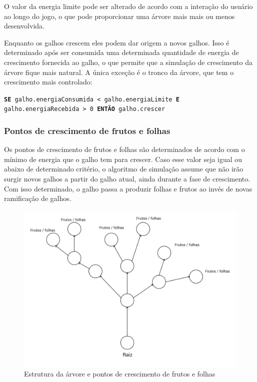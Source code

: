 \documentclass[12pt]{article}
\begin{document}
O valor da energia limite pode
ser alterado de acordo com a intera\c c\~ao do usu\'ario ao longo do jogo, o que pode proporcionar uma \'arvore mais
mais ou menos desenvolvida.

Enquanto os galhos crescem eles podem dar origem a novos galhos. Isso \'e determinado ap\'os ser consumida uma determinada
quantidade de energia de crescimento fornecida ao galho, o que permite que a simula\c c\~ao de crescimento da \'arvore
fique mais natural. A \'unica exce\c c\~ao \'e o tronco da \'arvore, que tem o crescimento
mais controlado:

\texttt{\footnotesize{\textbf{SE} galho.energiaConsumida < galho.energiaLimite \textbf{E} galho.energiaRecebida > 0
\textbf{ENT\~AO} galho.crescer}}

\subsubsection{Pontos de crescimento de frutos e folhas}
Os pontos de crescimento de frutos e folhas s\~ao determinados de acordo com o m\'inimo de energia que o galho
tem para crescer. Caso esse valor seja igual ou abaixo de determinado crit\'erio, o algoritmo de simula\c c\~ao assume
que n\~ao ir\~ao surgir novos galhos a partir do galho atual, ainda durante a fase de crescimento. Com isso determinado,
o galho passa a produzir folhas e frutos ao inv\'es de novas ramifica\c c\~ao de galhos.

	\begin{figure}[ht!]
	\begin{center}
		\includegraphics[scale=0.15]{img/PI3_Arvore.png}
		\footnotesize \caption{Estrutura da \'arvore e pontos de crescimento de frutos e folhas }
	\end{center}
	\end{figure}	
\end{document}

